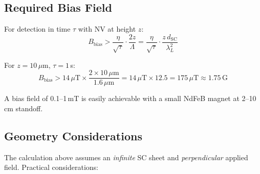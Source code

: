 \subsection{Required Bias Field}
\label{sec:oq1_bias}

For detection in time $\tau$ with NV at height $z$:
\begin{equation}
  B_\text{bias} > \frac{\eta}{\sqrt{\tau}} \cdot \frac{2z}{\Lambda}
  = \frac{\eta}{\sqrt{\tau}} \cdot \frac{z\,d_\text{SC}}{\lambda_L^2}
\end{equation}

For $z = 10\,\mu$m, $\tau = 1$\,s:
\begin{equation}
  B_\text{bias} > 14\,\mu\text{T} \times \frac{2 \times 10\,\mu\text{m}}{1.6\,\mu\text{m}}
  = 14\,\mu\text{T} \times 12.5 = 175\,\mu\text{T} \approx 1.75\,\text{G}
\end{equation}

A bias field of 0.1--1\,mT is easily achievable with a small NdFeB magnet
at 2--10\,cm standoff.

\subsection{Geometry Considerations}
\label{sec:oq1_geometry}

The calculation above assumes an \emph{infinite} SC sheet and \emph{perpendicular}
applied field. Practical considerations:

